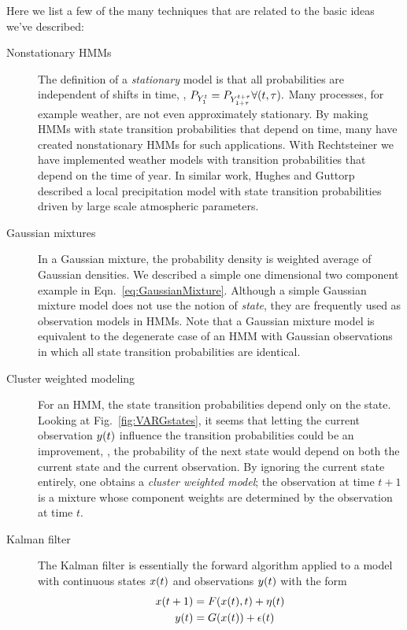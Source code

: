 Here we list a few of the many techniques that are related to the
basic ideas we've described:
\begin{description}
\item[Nonstationary HMMs] The definition of a \emph{stationary} model
  is that all probabilities are independent of shifts in time, \ie, $
  P_{Y_{1}^{t}} = P_{Y_{1+\tau}^{t+\tau}} \forall (t,\tau).$
  Many processes, for example weather, are not even approximately
  stationary.  By making HMMs with state transition probabilities that
  depend on time, many have created nonstationary HMMs for such
  applications.  With Rechtsteiner\cite{Rechtsteiner2000} we have
  implemented weather models with transition probabilities that depend
  on the time of year.  In similar work, Hughes and
  Guttorp\cite{Hughes99} described a local precipitation model with
  state transition probabilities driven by large scale atmospheric
  parameters.
\item[Gaussian mixtures] In a Gaussian mixture, the probability
  density is weighted average of Gaussian densities.  We described a
  simple one dimensional two component example in
  Eqn.~\eqref{eq:GaussianMixture}.  Although a simple Gaussian mixture
  model does not use the notion of \emph{state}, they are frequently
  used as observation models in HMMs.  Note that a Gaussian mixture
  model is equivalent to the degenerate case of an HMM with Gaussian
  observations in which all state transition probabilities are
  identical.
\item[Cluster weighted modeling] For an HMM, the state transition
  probabilities depend only on the state.  Looking at
  Fig.~\ref{fig:VARGstates}, it seems that letting the current
  observation ${y}{(t)}$ influence the transition probabilities could
  be an improvement, \ie, the probability of the next state would
  depend on both the current state and the current observation.  By
  ignoring the current state entirely, one obtains a \emph{ cluster
    weighted model}\cite{Gershenfeld99}; the observation at time $t+1$
  is a mixture whose component weights are determined by the
  observation at time $t$.
\item[Kalman filter] The Kalman filter is essentially the forward
  algorithm applied to a model with continuous states ${x}{(t)}$ and
  observations ${y}{(t)}$ with the form
  \begin{align*}
    {x}{(t+1)} &= F({x}{(t)},t) + {\eta}{(t)}\\
    {y}{(t)} &= G({x}{(t)}) + {\epsilon}{(t)}
  \end{align*}

\end{description}
